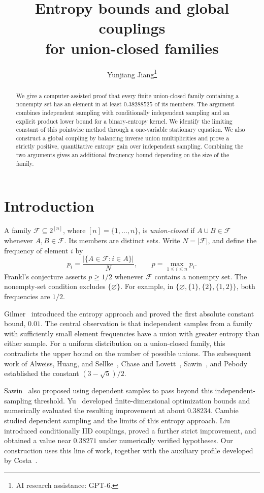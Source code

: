 \documentclass[11pt]{article}
\title{Entropy bounds and global couplings\\for union-closed families}
\author{Yunjiang Jiang\thanks{AI research assistance: GPT-6.}}
\date{}
\theoremstyle{remark}
\newcommand{\F}{\mathcal F}
\begin{document}
\maketitle
\begin{abstract}
We give a computer-assisted proof that every finite union-closed family
containing a nonempty set has an element in at least
\(0.38288525\) of its members. The argument combines independent sampling
with conditionally independent sampling and an explicit product lower
bound for a binary-entropy kernel. We identify the limiting constant of
this pointwise method through a one-variable stationary equation.
We also construct a global coupling by balancing inverse union
multiplicities and prove a strictly positive, quantitative entropy gain
over independent sampling. Combining the two arguments gives an
additional frequency bound depending on the size of the family.
\end{abstract}

\section{Introduction}\label{sec:statement}

A family \(\F\subseteq 2^{[n]}\), where \([n]=\{1,\ldots,n\}\), is
\emph{union-closed} if \(A\cup B\in\F\) whenever \(A,B\in\F\).
Its members are distinct sets. Write \(N=|\F|\), and define the frequency
of element \(i\) by
\[
p_i=\frac{|\{A\in\F:i\in A\}|}{N},\qquad
p=\max_{1\le i\le n}p_i.
\]
Frankl's conjecture asserts \(p\ge1/2\) whenever \(\F\) contains a
nonempty set. The nonempty-set condition excludes \(\{\varnothing\}\).
For example, in
\(\{\varnothing,\{1\},\{2\},\{1,2\}\}\), both frequencies are \(1/2\).


Gilmer~\cite{gilmer} introduced the entropy approach and proved the
first absolute constant bound, \(0.01\). The central observation is
that independent samples from a family with sufficiently small element
frequencies have a union with greater entropy than either sample.
For a uniform distribution on a union-closed family, this contradicts
the upper bound on the number of possible unions.
The subsequent work of Alweiss, Huang, and Sellke~\cite{ahs},
Chase and Lovett~\cite{chase-lovett}, Sawin~\cite{sawin}, and
Pebody~\cite{pebody} established the constant
\((3-\sqrt5)/2\).

Sawin~\cite{sawin} also proposed using dependent samples to pass beyond
this independent-sampling threshold.
Yu~\cite{yu} developed finite-dimensional optimization bounds and
numerically evaluated the resulting improvement at about \(0.38234\).
Cambie~\cite{cambie} studied dependent sampling and the limits of this
entropy approach. Liu~\cite{liu} introduced conditionally IID
couplings, proved a further strict improvement, and obtained a value
near \(0.38271\) under numerically verified hypotheses.
Our construction uses this line of work, together with the auxiliary
profile developed by Costa~\cite{costa}.
\end{document}
